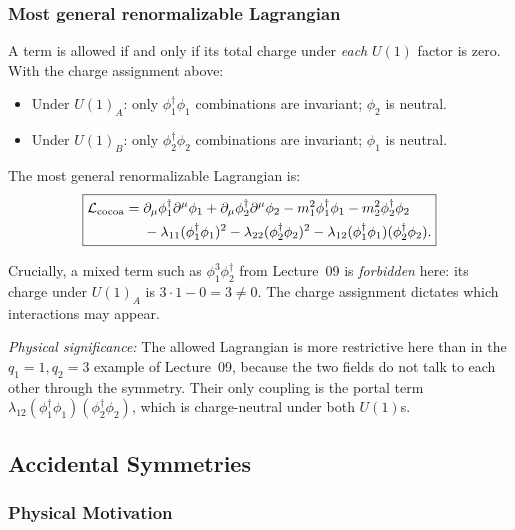 \documentclass[../main.tex]{subfiles}
\begin{document}
\subsubsection*{Most general renormalizable Lagrangian}

A term is allowed if and only if its total charge under \emph{each} $U(1)$ factor is zero.  With the charge assignment above:
\begin{itemize}
  \item Under $U(1)_A$: only $\phi_1^\dagger\phi_1$ combinations are invariant; $\phi_2$ is neutral.
  \item Under $U(1)_B$: only $\phi_2^\dagger\phi_2$ combinations are invariant; $\phi_1$ is neutral.
\end{itemize}

The most general renormalizable Lagrangian is:
\begin{equation}
  \boxed{
  \begin{aligned}
  \mathcal{L}_{\rm cocoa}
  ={}&
  \partial_\mu\phi_1^\dagger\partial^\mu\phi_1
  +\partial_\mu\phi_2^\dagger\partial^\mu\phi_2
  -m_1^2\phi_1^\dagger\phi_1
  -m_2^2\phi_2^\dagger\phi_2 \\
  &-\lambda_{11}(\phi_1^\dagger\phi_1)^2
  -\lambda_{22}(\phi_2^\dagger\phi_2)^2
  -\lambda_{12}(\phi_1^\dagger\phi_1)(\phi_2^\dagger\phi_2).
  \end{aligned}}
  \label{eq:lec10:cocoa-lagrangian}
\end{equation}

Crucially, a mixed term such as $\phi_1^3\phi_2^\dagger$ from Lecture~09 is \emph{forbidden} here: its charge under $U(1)_A$ is $3\cdot1-0=3\neq0$.  The charge assignment dictates which interactions may appear.

\textit{Physical significance:} The allowed Lagrangian is more restrictive here than in the $q_1=1,q_2=3$ example of Lecture~09, because the two fields do not talk to each other through the symmetry.  Their only coupling is the portal term $\lambda_{12}(\phi_1^\dagger\phi_1)(\phi_2^\dagger\phi_2)$, which is charge-neutral under both $U(1)$s.

\subsection*{Accidental Symmetries}

\subsubsection*{Physical Motivation}
\end{document}
